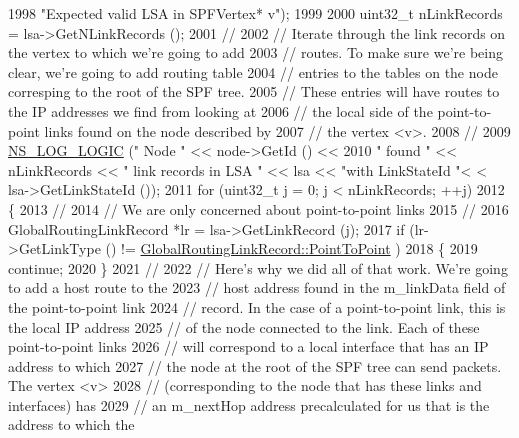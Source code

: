 \begin{DoxyCode}
1998                          \textcolor{stringliteral}{"Expected valid LSA in SPFVertex* v"});
1999 
2000           uint32\_t nLinkRecords = lsa->GetNLinkRecords ();
2001 \textcolor{comment}{//}
2002 \textcolor{comment}{// Iterate through the link records on the vertex to which we're going to add}
2003 \textcolor{comment}{// routes.  To make sure we're being clear, we're going to add routing table}
2004 \textcolor{comment}{// entries to the tables on the node corresping to the root of the SPF tree.}
2005 \textcolor{comment}{// These entries will have routes to the IP addresses we find from looking at}
2006 \textcolor{comment}{// the local side of the point-to-point links found on the node described by}
2007 \textcolor{comment}{// the vertex <v>.}
2008 \textcolor{comment}{//}
2009           \hyperlink{group__logging_ga88acd260151caf2db9c0fc84997f45ce}{NS\_LOG\_LOGIC} (\textcolor{stringliteral}{" Node "} << node->GetId () <<
2010                         \textcolor{stringliteral}{" found "} << nLinkRecords << \textcolor{stringliteral}{" link records in LSA "} << lsa << \textcolor{stringliteral}{"with LinkStateId "}<
      < lsa->GetLinkStateId ());
2011           \textcolor{keywordflow}{for} (uint32\_t j = 0; j < nLinkRecords; ++j)
2012             \{
2013 \textcolor{comment}{//}
2014 \textcolor{comment}{// We are only concerned about point-to-point links}
2015 \textcolor{comment}{//}
2016               GlobalRoutingLinkRecord *lr = lsa->GetLinkRecord (j);
2017               \textcolor{keywordflow}{if} (lr->GetLinkType () != \hyperlink{classns3_1_1GlobalRoutingLinkRecord_a9380bcce9bca03943c4761b166a694f4aa345c79cdcaba957f5e8296509183912}{GlobalRoutingLinkRecord::PointToPoint}
      )
2018                 \{
2019                   \textcolor{keywordflow}{continue};
2020                 \}
2021 \textcolor{comment}{//}
2022 \textcolor{comment}{// Here's why we did all of that work.  We're going to add a host route to the}
2023 \textcolor{comment}{// host address found in the m\_linkData field of the point-to-point link}
2024 \textcolor{comment}{// record.  In the case of a point-to-point link, this is the local IP address}
2025 \textcolor{comment}{// of the node connected to the link.  Each of these point-to-point links}
2026 \textcolor{comment}{// will correspond to a local interface that has an IP address to which}
2027 \textcolor{comment}{// the node at the root of the SPF tree can send packets.  The vertex <v> }
2028 \textcolor{comment}{// (corresponding to the node that has these links and interfaces) has }
2029 \textcolor{comment}{// an m\_nextHop address precalculated for us that is the address to which the}

\end{DoxyCode}
